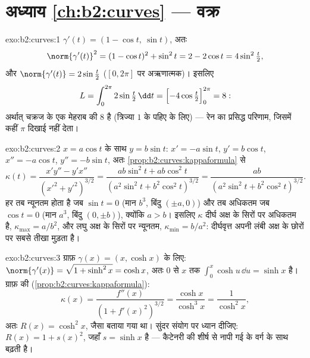 \section*{अध्याय \ref{ch:b2:curves} --- वक्र}

\begin{solution}{exo:b2:curves:1}
$\gamma'(t) = (1 - \cos t,\ \sin t)$, अतः
\[
\norm{\gamma'(t)}^2 = (1 - \cos t)^2 + \sin^2 t
= 2 - 2\cos t = 4\sin^2\tfrac t2 ,
\]
और $\norm{\gamma'(t)} = 2\sin\frac t2$ ($[0,
2\pi]$ पर अऋणात्मक)। इसलिए
\[
L = \int_0^{2\pi} 2\sin\tfrac t2\,\dd t
= \Bigl[-4\cos\tfrac t2\Bigr]_0^{2\pi} = 8 :
\]
अर्थात् चक्रज के एक मेहराब की  $8$ है (त्रिज्या $1$ के
पहिए के लिए) --- रेन का प्रसिद्ध परिणाम, जिसमें कहीं $\pi$ दिखाई नहीं देता।
\end{solution}

\begin{solution}{exo:b2:curves:2}
$x = a\cos t$ के साथ $y = b\sin t$: $x' = -a\sin t$, $y' = b\cos
t$, $x'' = -a\cos t$, $y'' = -b\sin t$, अतः
\cref{prop:b2:curves:kappaformula} से
\[
\kappa(t)
= \frac{x'y'' - y'x''}{(x'^2 + y'^2)^{3/2}}
= \frac{ab\sin^2 t + ab\cos^2 t}
       {(a^2\sin^2 t + b^2\cos^2 t)^{3/2}}
= \frac{ab}{(a^2\sin^2 t + b^2\cos^2 t)^{3/2}} .
\]
हर तब न्यूनतम होता है जब $\sin t = 0$ (मान $b^3$, बिंदु
$(\pm a, 0)$) और तब अधिकतम जब $\cos t = 0$ (मान $a^3$, बिंदु
$(0, \pm b)$), क्योंकि $a > b$। इसलिए $\kappa$ दीर्घ अक्ष के सिरों पर
अधिकतम है, $\kappa_{\max} = a/b^2$, और लघु अक्ष के सिरों पर न्यूनतम,
$\kappa_{\min} = b/a^2$: दीर्घवृत्त अपनी लंबी अक्ष के छोरों पर सबसे
तीखा मुड़ता है।
\end{solution}

\begin{solution}{exo:b2:curves:3}
ग्राफ़ $\gamma(x) = (x, \cosh x)$ के लिए: $\norm{\gamma'(x)} =
\sqrt{1 + \sinh^2 x} = \cosh x$, अतः $0$ से $x$ तक 
$\int_0^x \cosh u\,\dd u = \sinh x$ है। ग्राफ़ की 
(\cref{prop:b2:curves:kappaformula}):
\[
\kappa(x) = \frac{f''(x)}{(1 + f'(x)^2)^{3/2}}
= \frac{\cosh x}{\cosh^3 x} = \frac{1}{\cosh^2 x} ,
\]
अतः $R(x) = \cosh^2 x$, जैसा बताया गया था। सुंदर संयोग पर ध्यान दीजिए:
$R(x) = 1 + s(x)^2$, जहाँ $s = \sinh x$  है --- कैटेनरी की  शीर्ष से नापी गई  के वर्ग के साथ बढ़ती है।
\end{solution}

